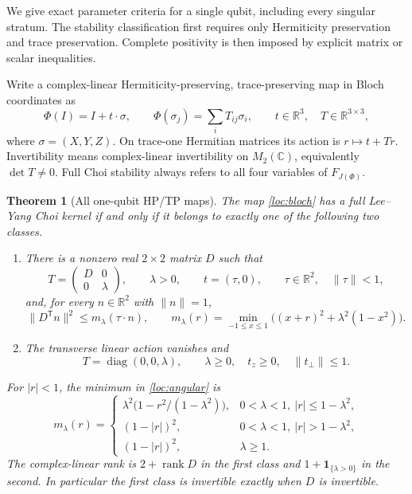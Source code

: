 \documentclass[reqno]{amsart}
\newtheorem{theorem}{Theorem}[section]
\theoremstyle{definition}
\theoremstyle{remark}
\newcommand{\C}{\mathbb C}
\newcommand{\R}{\mathbb R}
\DeclareMathOperator{\rank}{rank}
\DeclareMathOperator{\diag}{diag}
\begin{document}
We give exact parameter criteria for a single qubit, including every
singular stratum.  The stability classification first requires only
Hermiticity preservation and trace preservation.  Complete positivity is
then imposed by explicit matrix or scalar inequalities.

Write a complex-linear Hermiticity-preserving, trace-preserving map in
Bloch coordinates as
\begin{equation}\label{loc:bloch}
 \Phi(I)=I+t\cdot\sigma,\qquad
 \Phi(\sigma_j)=\sum_iT_{ij}\sigma_i,
 \qquad t\in\R^3,\quad T\in\R^{3\times3},
\end{equation}
where $\sigma=(X,Y,Z)$.  On trace-one Hermitian matrices its action is
$r\mapsto t+Tr$.  Invertibility means complex-linear invertibility on
$M_2(\C)$, equivalently $\det T\ne0$.  Full Choi stability always
refers to all four variables of $F_{J(\Phi)}$.

\begin{theorem}[All one-qubit HP/TP maps]\label{loc:classification}
The map \eqref{loc:bloch} has a full Lee--Yang Choi kernel if and only if
it belongs to exactly one of the following two classes.
\begin{enumerate}
\item There is a nonzero real $2\times2$ matrix $D$ such that
\begin{equation}\label{loc:transverse-form}
 T=\begin{pmatrix}D&0\\0&\lambda\end{pmatrix},\qquad
 \lambda>0,\qquad t=(\tau,0),\qquad \tau\in\R^2,\quad\|\tau\|<1,
\end{equation}
and, for every $n\in\R^2$ with $\|n\|=1$,
\begin{equation}\label{loc:angular}
 \|D^{\mathsf T}n\|^2\leq m_\lambda(\tau\cdot n),\qquad
 m_\lambda(r)=\min_{-1\leq x\leq1}
                  \bigl((x+r)^2+\lambda^2(1-x^2)\bigr).
\end{equation}
\item The transverse linear action vanishes and
\begin{equation}\label{loc:erasure-form}
 T=\diag(0,0,\lambda),\qquad
 \lambda\geq0,\quad t_z\geq0,\quad\|t_\perp\|\leq1.
\end{equation}
\end{enumerate}
For $|r|<1$, the minimum in \eqref{loc:angular} is
\begin{equation}\label{loc:minimum}
 m_\lambda(r)=
 \begin{cases}
 \lambda^2\bigl(1-r^2/(1-\lambda^2)\bigr),
   &0<\lambda<1,\ |r|\leq1-\lambda^2,\\
 (1-|r|)^2,&0<\lambda<1,\ |r|>1-\lambda^2,\\
 (1-|r|)^2,&\lambda\geq1.
 \end{cases}
\end{equation}
The complex-linear rank is $2+\rank D$ in the first class and
$1+\boldsymbol{1}_{\{\lambda>0\}}$ in the second.  In particular the
first class is invertible exactly when $D$ is invertible.
\end{theorem}
\end{document}
